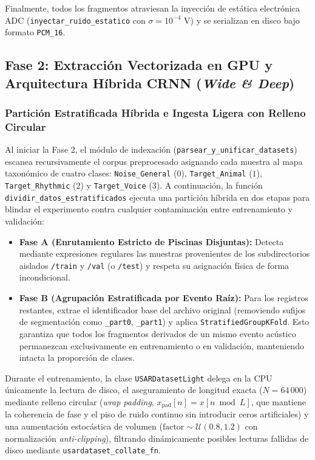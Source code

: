 \documentclass[11pt, a4paper]{article}
\begin{document}
Finalmente, todos los fragmentos atraviesan la inyección de estática electrónica ADC (\texttt{inyectar\_ruido\_estatico} con $\sigma = 10^{-4}\text{ V}$) y se serializan en disco bajo formato \texttt{PCM\_16}.

\subsection{Fase 2: Extracción Vectorizada en GPU y Arquitectura Híbrida CRNN (\textit{Wide \& Deep})}

\subsubsection{Partición Estratificada Híbrida e Ingesta Ligera con Relleno Circular}
Al iniciar la Fase 2, el módulo de indexación (\texttt{parsear\_y\_unificar\_datasets}) escanea recursivamente el corpus preprocesado asignando cada muestra al mapa taxonómico de cuatro clases: \texttt{Noise\_General} ($0$), \texttt{Target\_Animal} ($1$), \texttt{Target\_Rhythmic} ($2$) y \texttt{Target\_Voice} ($3$). A continuación, la función \texttt{dividir\_datos\_estratificados} ejecuta una partición híbrida en dos etapas para blindar el experimento contra cualquier contaminación entre entrenamiento y validación:
\begin{itemize}
    \item \textbf{Fase A (Enrutamiento Estricto de Piscinas Disjuntas):} Detecta mediante expresiones regulares las muestras provenientes de los subdirectorios aislados \texttt{/train} y \texttt{/val} (o \texttt{/test}) y respeta su asignación física de forma incondicional.
    \item \textbf{Fase B (Agrupación Estratificada por Evento Raíz):} Para los registros restantes, extrae el identificador base del archivo original (removiendo sufijos de segmentación como \texttt{\_part0}, \texttt{\_part1}) y aplica \texttt{StratifiedGroupKFold}. Esto garantiza que todos los fragmentos derivados de un mismo evento acústico permanezcan exclusivamente en entrenamiento o en validación, manteniendo intacta la proporción de clases.
\end{itemize}

Durante el entrenamiento, la clase \texttt{USARDatasetLight} delega en la CPU únicamente la lectura de disco, el aseguramiento de longitud exacta ($N = 64\,000$) mediante relleno circular (\textit{wrap padding}, $x_{\text{pad}}[n] = x[n \bmod L]$, que mantiene la coherencia de fase y el piso de ruido continuo sin introducir ceros artificiales) y una aumentación estocástica de volumen ($\text{factor} \sim \mathcal{U}(0.8, 1.2)$ con normalización \textit{anti-clipping}), filtrando dinámicamente posibles lecturas fallidas de disco mediante \texttt{usardataset\_collate\_fn}.
\end{document}
